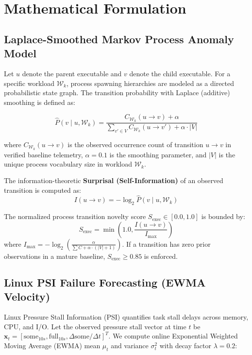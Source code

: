 \documentclass[conference]{IEEEtran}
\begin{document}
\section{Mathematical Formulation}
\label{sec:math}

\subsection{Laplace-Smoothed Markov Process Anomaly Model}
Let $u$ denote the parent executable and $v$ denote the child executable. For a specific workload $\mathcal{W}_k$, process spawning hierarchies are modeled as a directed probabilistic state graph. The transition probability with Laplace (additive) smoothing is defined as:

\begin{equation}
\hat{P}(v \mid u, \mathcal{W}_k) = \frac{C_{\mathcal{W}_k}(u \to v) + \alpha}{\sum_{v' \in V} C_{\mathcal{W}_k}(u \to v') + \alpha \cdot |V|}
\end{equation}

where $C_{\mathcal{W}_k}(u \to v)$ is the observed occurrence count of transition $u \to v$ in verified baseline telemetry, $\alpha = 0.1$ is the smoothing parameter, and $|V|$ is the unique process vocabulary size in workload $\mathcal{W}_k$.

The information-theoretic \textbf{Surprisal (Self-Information)} of an observed transition is computed as:
\begin{equation}
I(u \to v) = -\log_2 \hat{P}(v \mid u, \mathcal{W}_k)
\end{equation}

The normalized process transition novelty score $S_{\text{exec}} \in [0.0, 1.0]$ is bounded by:
\begin{equation}
S_{\text{exec}} = \min\left(1.0, \frac{I(u \to v)}{I_{\text{max}}}\right)
\end{equation}
where $I_{\text{max}} = -\log_2\left(\frac{\alpha}{\sum C + \alpha \cdot (|V| + 1)}\right)$. If a transition has zero prior observations in a mature baseline, $S_{\text{exec}} \ge 0.85$ is enforced.

\subsection{Linux PSI Failure Forecasting (EWMA Velocity)}
Linux Pressure Stall Information (PSI) quantifies task stall delays across memory, CPU, and I/O. Let the observed pressure stall vector at time $t$ be $\mathbf{x}_t = [\text{some}_{10s}, \text{full}_{10s}, \Delta\text{some}/\Delta t]^T$. We compute online Exponential Weighted Moving Average (EWMA) mean $\mu_t$ and variance $\sigma_t^2$ with decay factor $\lambda = 0.2$:
\end{document}
